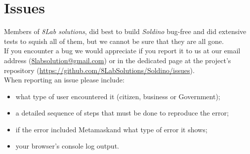 \section{Issues}
Members of \textit{8Lab solutions}, did best to build \textit{Soldino} 
bug-free and did extensive tests to squish all of them, but we cannot be sure 
that they are all gone.\\
If you encounter a bug we would appreciate if you report it to us at our 
email address (\href{mailto:8labsolution@gmail.com}{8labsolution@gmail.com}) 
or in the dedicated page at the project's repository (\url{https://github.com/8LabSolutions/Soldino/issues}).
\\When reporting an issue please include:
\begin{itemize}
	\item what type of user encountered it (citizen, business or Government);
	\item a detailed sequence of steps that must be done to reproduce the error;
	\item if the error included Metamask\glosp and what type of error it shows;
	\item your browser's console log output.
\end{itemize}

